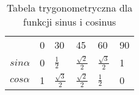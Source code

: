 \begin{table}[htbp]
\centering
\begin{tabular}{llllll}
     & 0 & 30  & 45                          & 60                          & 90 \\
$sin\alpha$ & 0 & $\frac{1}{2}$ & $\frac{\sqrt{2}}{2}$ & $\frac{\sqrt{3}}{2}$ & 1  \\
$cos\alpha$ & 1 & $\frac{\sqrt{3}}{2}$ & $\frac{\sqrt{2}}{2}$ & $\frac{1}{2}$                           & 0 
\end{tabular}
\caption{Tabela trygonometryczna dla funkcji sinus i cosinus}
\label{tab:trygo}
\end{table}